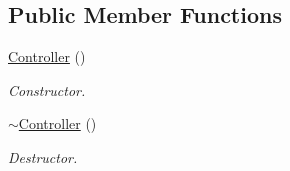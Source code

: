 \subsection*{Public Member Functions}
\begin{DoxyCompactItemize}
\item 
\hypertarget{classContent_1_1Actor_1_1Renderer_1_1Controller_a6cab14ab7b584c97db223e4ed51e406a}{
\hyperlink{classContent_1_1Actor_1_1Renderer_1_1Controller_a6cab14ab7b584c97db223e4ed51e406a}{Controller} ()}
\label{classContent_1_1Actor_1_1Renderer_1_1Controller_a6cab14ab7b584c97db223e4ed51e406a}

\begin{DoxyCompactList}\small\item\em Constructor. \item\end{DoxyCompactList}\item 
\hypertarget{classContent_1_1Actor_1_1Renderer_1_1Controller_a7f32c0e09100149bf35df28f3f28adf9}{
\hyperlink{classContent_1_1Actor_1_1Renderer_1_1Controller_a7f32c0e09100149bf35df28f3f28adf9}{$\sim$Controller} ()}
\label{classContent_1_1Actor_1_1Renderer_1_1Controller_a7f32c0e09100149bf35df28f3f28adf9}

\begin{DoxyCompactList}\small\item\em Destructor. \item\end{DoxyCompactList}\end{DoxyCompactItemize}
